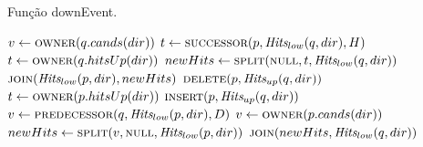 \begin{algorithm}
    \caption{Função downEvent.} \label{par:eventodown}
    \begin{algorithmic}[1]
                \State $v \leftarrow \Call{owner}{q.cands(dir)}$
                    \State {}
                \EndIf
                \State {}
                \State $t \leftarrow \Call{successor}{p, \Hits_{low}(q, dir), H}$
                    \State $t \leftarrow \Call{owner}{q.hitsUp(dir)}$
                \EndIf
                \State $newHits \leftarrow \Call{split}{\nnull, t, \Hits_{low}(q, dir)}$
                \State $\Call{join}{\Hits_{low}(p, dir), newHits}$
                \State $\Call{delete}{p, \Hits_{up}(q, dir)}$
                    \State {}
                \EndIf
            \Else
                    \State $t \leftarrow \Call{owner}{p.hitsUp(dir)}$
                        \State {}
                    \EndIf
                    \State $\Call{insert}{p, \Hits_{up}(q, dir)}$
                    \State $v \leftarrow \Call{predecessor}{q, \Hits_{low}(p, dir), D}$
                        \State $v \leftarrow \Call{owner}{p.cands(dir)}$
                    \EndIf
                    \State $newHits \leftarrow \Call{split}{v, \nnull, \Hits_{low}(p,dir)}$
                    \State $\Call{join}{newHits, \Hits_{low}(q, dir)}$
                    \State {}
                        \State {}
                    \EndIf
                \EndIf
            \EndIf
        \EndFunction
    \end{algorithmic}
\end{algorithm}